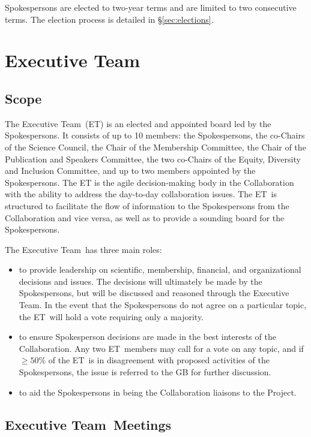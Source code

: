 \documentclass[12pt]{article}
\newcommand{\exec}{{Executive Team}}
\newcommand{\shorte}{{ET}}  %
\begin{document}
Spokespersons are elected to two-year terms and are limited to two consecutive terms. The election process is detailed in \S\ref{sec:elections}.

\section{\exec}
\label{sec:exec}

\subsection{Scope}

The \exec \ (\shorte) is an elected and appointed board led by the Spokespersons. It consists of up to 10 members: the Spokespersons, the co-Chairs of the Science Council,  the Chair of the Membership Committee, the Chair of the Publication and Speakers Committee, the two co-Chairs of the Equity, Diversity and Inclusion Committee, and up to two members appointed by the Spokespersons. The ET is the agile decision-making body in the Collaboration with the ability to address the day-to-day collaboration issues.  The \shorte\ is structured to facilitate the flow of information to the Spokespersons from the Collaboration and vice versa, as well as to provide a sounding board for the Spokespersons.

The \exec \ has three main roles:
\begin{itemize}
\item to provide leadership on scientific, membership, financial, and organizational decisions and issues. The decisions will ultimately be made by the Spokespersons, but will be discussed and reasoned through the \exec.  In the event that the Spokespersons do not agree on a particular topic, the \shorte\ will hold a vote requiring only a majority.
\item to ensure Spokesperson decisions are made in the best interests of the Collaboration.  Any two \shorte\ members may call for a vote on any topic, and if $\geq 50\%$ of the \shorte\ is in disagreement with proposed activities of the Spokespersons, the issue is referred to the GB for further discussion.
\item to aid the Spokespersons in being the Collaboration liaisons to the Project.
\end{itemize}

\subsection{\exec \ Meetings}
\end{document}
